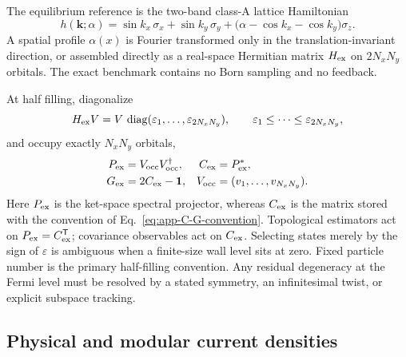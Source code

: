 The equilibrium reference is the two-band class-A lattice Hamiltonian
\begin{equation}
    h(\mathbf k;\alpha)
    =\sin k_x\,\sigma_x+\sin k_y\,\sigma_y
     +\bigl(\alpha-\cos k_x-\cos k_y\bigr)\sigma_z.
    \label{eq:app-QWZ-Hamiltonian}
\end{equation}
A spatial profile \(\alpha(x)\) is Fourier transformed only in the
translation-invariant direction, or assembled directly as a real-space
Hermitian matrix \(H_{\rm ex}\) on \(2N_xN_y\) orbitals.  The exact benchmark
contains no Born sampling and no feedback.

At half filling, diagonalize
\begin{equation}
    H_{\rm ex}V=V\,\operatorname{diag}(\varepsilon_1,\ldots,\varepsilon_{2N_xN_y}),
    \qquad
    \varepsilon_1\le\cdots\le\varepsilon_{2N_xN_y},
\end{equation}
and occupy exactly \(N_xN_y\) orbitals,
\begin{align}
    P_{\rm ex}&=V_{\rm occ}V_{\rm occ}^\dagger,
    &C_{\rm ex}&=P_{\rm ex}^*,\nonumber\\
    G_{\rm ex}&=2C_{\rm ex}-\mathbf{1},
    &V_{\rm occ}&=(v_1,\ldots,v_{N_xN_y}).
    \label{eq:app-exact-half-filled-projector}
\end{align}
Here \(P_{\rm ex}\) is the ket-space spectral projector, whereas
\(C_{\rm ex}\) is the matrix stored with the convention of
Eq.~\eqref{eq:app-C-G-convention}.  Topological estimators act on
\(P_{\rm ex}=C_{\rm ex}^{\mathsf T}\); covariance observables act on
\(C_{\rm ex}\).
Selecting states merely by the sign of \(\varepsilon\) is ambiguous when a
finite-size wall level sits at zero.  Fixed particle number is the primary
half-filling convention.  Any residual degeneracy at the Fermi level must be
resolved by a stated symmetry, an infinitesimal twist, or explicit
subspace tracking.

\subsection{Physical and modular current densities}
\label{app:physical-modular-current}

